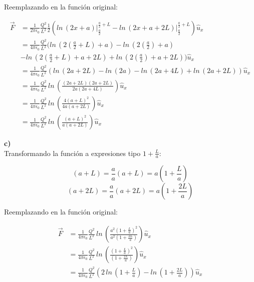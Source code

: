 \documentclass[letter,11pt]{article}
\begin{document}
Reemplazando en la función original:

\begin{equation*}
\begin{split}
    \vec{F} &= \frac{1}{2\pi\epsilon_0}\frac{Q^2}{L^2}\frac{1}{2}
               \left(ln\,(2x+a)\Biggr|_{\frac{a}{2}}^{\frac{a}{2}+L}-
               ln\,(2x+a+2L)\Biggr|_{\frac{a}{2}}^{\frac{a}{2}+L}\right)
               \hat{u}_x\\
            &= \frac{1}{4\pi\epsilon_0}\frac{Q^2}{L^2}
               (ln\,(2(\frac{a}{2}+L)+a)-ln\,(2(\frac{a}{2})+a)\\
            &- ln\,(2(\frac{a}{2}+L)+a+2L)+ln\,(2(\frac{a}{2})+a+2L))\hat{u}_x\\
            &= \frac{1}{4\pi\epsilon_0}\frac{Q^2}{L^2}
               \left(ln\,(2a+2L)-ln\,(2a)-
               ln\,(2a+4L)+ln\,(2a+2L)\right)\hat{u}_x\\
            &= \frac{1}{4\pi\epsilon_0}\frac{Q^2}{L^2}\,
               ln\,\left(\frac{(2a+2L)(2a+2L)}{2a(2a+4L)}\right)\hat{u}_x\\
            &= \frac{1}{4\pi\epsilon_0}\frac{Q^2}{L^2}\,
               ln\,\left(\frac{4(a+L)^2}{4a(a+2L)}\right)\hat{u}_x\\
            &= \frac{1}{4\pi\epsilon_0}\frac{Q^2}{L^2}\,
              ln\,\left(\frac{(a+L)^2}{a(a+2L)}\right)\hat{u}_x
\end{split}
\end{equation*}
\vspace{0.20cm}

\textbf{c)}\\

Transformando la función a expresiones tipo $1+\frac{L}{a}$:

\begin{equation*}
    (a+L) = \frac{a}{a}(a+L)
          = a\left(1+\frac{L}{a}\right)
\end{equation*}
\begin{equation*}
    (a+2L) = \frac{a}{a}(a+2L)
           = a\left(1+\frac{2L}{a}\right)
\end{equation*}
\vspace{0.20cm}

Reemplazando en la función original:

\begin{equation*}
\begin{split}
    \vec{F} &= \frac{1}{4\pi\epsilon_0}\frac{Q^2}{L^2}\,ln\,\left(
               \frac{a^2(1+\frac{L}{a})^2}{a^2(1+\frac{2L}{a})}\right)
               \hat{u}_x\\
            &= \frac{1}{4\pi\epsilon_0}\frac{Q^2}{L^2}\,ln\,\left(
               \frac{(1+\frac{L}{a})^2}{(1+\frac{2L}{a})}\right)\hat{u}_x\\
            &= \frac{1}{4\pi\epsilon_0}\frac{Q^2}{L^2}
               \left(2\,ln\,\left(1+\frac{L}{a}\right)-
               ln\,\left(1+\frac{2L}{a}\right)\right)\hat{u}_x
\end{split}
\end{equation*}
\vspace{0.20cm}
\end{document}
